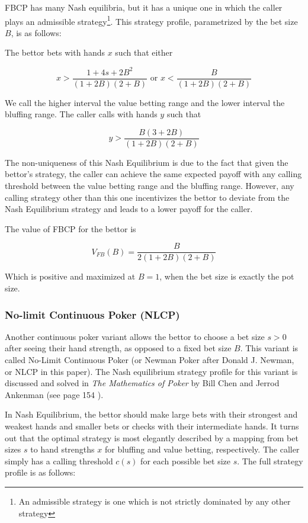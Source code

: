 \documentclass[a4paper,12pt]{article}
\theoremstyle{plain}
\theoremstyle{definition}
\begin{document}
FBCP has many Nash equilibria, but it has a unique one in which the caller plays an admissible strategy\footnote{An admissible strategy is one which is not strictly dominated by any other strategy}. This strategy profile, parametrized by the bet size $B$, is as follows:

The bettor bets with hands $x$ such that either 

$$x > \frac{1 + 4s + 2B^2}{(1+2B)(2+B)} \text{ or } x < \frac{B}{(1+2B)(2+B)}$$

We call the higher interval the value betting range and the lower interval the bluffing range. The caller calls with hands $y$ such that

$$ y > \frac{B(3 +2B)}{(1+2B)(2+B)} $$

The non-uniqueness of this Nash Equilibrium is due to the fact that given the bettor's strategy, the caller can achieve the same expected payoff with any calling threshold between the value betting range and the bluffing range. However, any calling strategy other than this one incentivizes the bettor to deviate from the Nash Equilibrium strategy and leads to a lower payoff for the caller. 

The value of FBCP for the bettor is 

$$ V_{FB}(B) = \frac{B}{2(1+2B)(2+B)} $$

Which is positive and maximized at $B = 1$, when the bet size is exactly the pot size. 

\subsubsection{No-limit Continuous Poker (NLCP)}
Another continuous poker variant allows the bettor to choose a bet size $s > 0$ after seeing their hand strength, as opposed to a fixed bet size $B$. This variant is called No-Limit Continuous Poker (or Newman Poker after Donald J. Newman, or NLCP in this paper). The Nash equilibrium strategy profile for this variant is discussed and solved in \textit{The Mathematics of Poker} by Bill Chen and Jerrod Ankenman (see page 154 ). 

In Nash Equilibrium, the bettor should make large bets with their strongest and weakest hands and smaller bets or checks with their intermediate hands. It turns out that the optimal strategy is most elegantly described by a mapping from bet sizes $s$ to hand strengths $x$ for bluffing and value betting, respectively. The caller simply has a calling threshold $c(s)$ for each possible bet size $s$. The full strategy profile is as follows:
\end{document}
